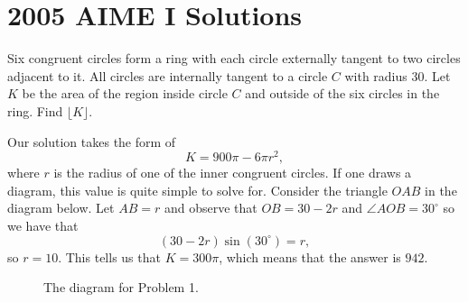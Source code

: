 \documentclass[a4paper, 12pt]{article}
\begin{document}
\section*{2005 AIME I Solutions}

\begin{chirpbox}
\begin{problemnum}
    Six congruent circles form a ring with each circle externally tangent to two circles adjacent to it. All circles are internally tangent to a circle \( C \) with radius \( 30 \). Let \( K \) be the area of the region inside circle \( C \) and outside of the six circles in the ring. Find \( \lfloor K \rfloor \).
\end{problemnum}
\end{chirpbox}

\begin{solution}
    Our solution takes the form of
    \[
        K = 900\pi - 6 \pi r^2
    ,\]
    where \( r \) is the radius of one of the inner congruent circles. If one draws a diagram, this value is quite simple to solve for. Consider the triangle \( OAB \) in the diagram below. Let \( AB = r \) and observe that \( OB  = 30 - 2r \) and \( \angle AOB = 30^\circ \) so we have that
    \[
        (30 - 2r) \sin{\left( 30^\circ \right)} = r
    ,\]
    so \( r = 10 \). This tells us that \( K = 300 \pi \), which means that the answer is \( \boxed{942} \).
    
    \begin{figure}[b!]
        \centering
        \caption{The diagram for Problem 1.}
    \end{figure}
\end{solution}
\end{document}
